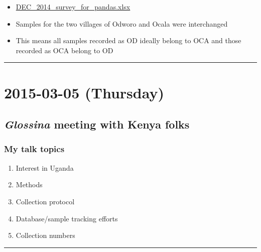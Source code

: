 \documentclass[letterpaper]{scrartcl}
\renewenvironment{quote}{\begin{blockquote}\list{}{\rightmargin=0em\leftmargin=0em}%
\item\relax\color{greytext}\ignorespaces}{\unskip\unskip\endlist\end{blockquote}}
\begin{document}
\begin{itemize}
\itemsep1pt\parskip0pt
\item
  \href{file:///home/gus/Dropbox/uganda_data/2014_Dec_new/DEC_2014_survey_for_pandas.xlsx}{DEC\_2014\_survey\_for\_pandas.xlsx}
\end{itemize}

\begin{quote}
\begin{itemize}
\itemsep1pt\parskip0pt
\item
  Samples for the two villages of Odworo and Ocala were interchanged
\item
  This means all samples recorded as OD ideally belong to OCA and those
  recorded as OCA belong to OD
\end{itemize}
\end{quote}

\begin{center}\rule{0.5\linewidth}{\linethickness}\end{center}

\section{2015-03-05 (Thursday)}\label{thursday}

\subsection{\emph{Glossina} meeting with Kenya
folks}\label{glossina-meeting-with-kenya-folks}

\subsubsection{My talk topics}\label{my-talk-topics}

\begin{enumerate}
\def\labelenumi{\arabic{enumi}.}
\item
  Interest in Uganda
\item
  Methods
\item
  Collection protocol
\item
  Database/sample tracking efforts
\item
  Collection numbers
\end{enumerate}

\begin{center}\rule{0.5\linewidth}{\linethickness}\end{center}
\end{document}
